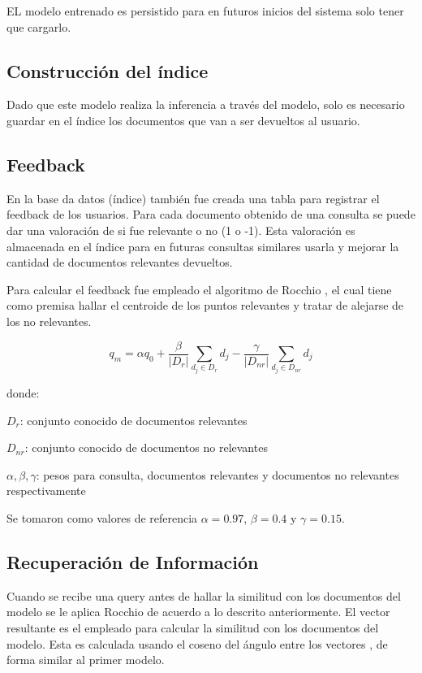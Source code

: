 \documentclass[12pt]{llncs}
\begin{document}
EL modelo entrenado es persistido para en futuros inicios del sistema solo tener que cargarlo.

\subsection{Construcción del índice}

Dado que este modelo realiza la inferencia a través del modelo, solo es necesario guardar en el índice los documentos que van a ser devueltos al usuario.

\subsection{Feedback}

En la base da datos (índice) también fue creada una tabla para registrar el feedback de los usuarios. Para cada documento obtenido de una consulta se puede dar una valoración de si fue relevante o no (1 o -1). Esta valoración es almacenada en el índice para en futuras consultas similares usarla y mejorar la cantidad de documentos relevantes devueltos.

Para calcular el feedback fue empleado el algoritmo de Rocchio \cite{roochio}, el cual tiene como premisa hallar el centroide de los puntos relevantes y tratar de alejarse de los no relevantes.

$$q_m = \alpha q_0 + \frac{\beta}{|D_r|} \sum_{d_j \in D_r} d_j - \frac{\gamma}{|D_{nr}|} \sum_{d_j \in D_{nr}} d_j$$

donde:

$D_r$: conjunto conocido de documentos relevantes

$D_{nr}$: conjunto conocido de documentos no relevantes

$\alpha, \beta, \gamma$: pesos para consulta, documentos relevantes y documentos no relevantes respectivamente

Se tomaron como valores de referencia $\alpha = 0.97$, $\beta = 0.4$ y $\gamma = 0.15$.

\subsection{Recuperación de Información}

Cuando se recibe una query antes de hallar la similitud con los documentos del modelo se le aplica Rocchio de acuerdo a lo descrito anteriormente. El vector resultante es el empleado para calcular la similitud con los documentos del modelo. Esta es calculada usando el coseno del ángulo entre los vectores \cite{ms}, de forma similar al primer modelo.
\end{document}
